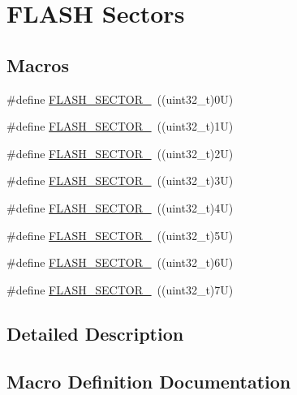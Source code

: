 \hypertarget{group___f_l_a_s_h___sectors}{}\section{F\+L\+A\+SH Sectors}
\label{group___f_l_a_s_h___sectors}
\subsection*{Macros}
\begin{DoxyCompactItemize}
\item 
\#define \mbox{\hyperlink{group___f_l_a_s_h___sectors_ga15a8729b9c5eb83d46d5f437cd46d874}{F\+L\+A\+S\+H\+\_\+\+S\+E\+C\+T\+O\+R\+\_}}~((uint32\+\_\+t)0\+U)
\item 
\#define \mbox{\hyperlink{group___f_l_a_s_h___sectors_ga2a85d94366030ea8328796169c1bc300}{F\+L\+A\+S\+H\+\_\+\+S\+E\+C\+T\+O\+R\+\_}}~((uint32\+\_\+t)1\+U)
\item 
\#define \mbox{\hyperlink{group___f_l_a_s_h___sectors_ga58999952d63fd45dd86b0817ad2a5bae}{F\+L\+A\+S\+H\+\_\+\+S\+E\+C\+T\+O\+R\+\_}}~((uint32\+\_\+t)2\+U)
\item 
\#define \mbox{\hyperlink{group___f_l_a_s_h___sectors_gab0a0ce95752a56b430c809a88812fed2}{F\+L\+A\+S\+H\+\_\+\+S\+E\+C\+T\+O\+R\+\_}}~((uint32\+\_\+t)3\+U)
\item 
\#define \mbox{\hyperlink{group___f_l_a_s_h___sectors_gac1338c8f4ab3ae74d212c59c7e9e4cc6}{F\+L\+A\+S\+H\+\_\+\+S\+E\+C\+T\+O\+R\+\_}}~((uint32\+\_\+t)4\+U)
\item 
\#define \mbox{\hyperlink{group___f_l_a_s_h___sectors_gad8736215a8d3ce115f4281a6d026d0f8}{F\+L\+A\+S\+H\+\_\+\+S\+E\+C\+T\+O\+R\+\_}}~((uint32\+\_\+t)5\+U)
\item 
\#define \mbox{\hyperlink{group___f_l_a_s_h___sectors_gaa0d1fc04e5918186ac9c228ab4172606}{F\+L\+A\+S\+H\+\_\+\+S\+E\+C\+T\+O\+R\+\_}}~((uint32\+\_\+t)6\+U)
\item 
\#define \mbox{\hyperlink{group___f_l_a_s_h___sectors_ga99693b9e0816fdb8706218bc845724ad}{F\+L\+A\+S\+H\+\_\+\+S\+E\+C\+T\+O\+R\+\_}}~((uint32\+\_\+t)7\+U)
\end{DoxyCompactItemize}


\subsection{Detailed Description}


\subsection{Macro Definition Documentation}
\mbox{\label{group___f_l_a_s_h___sectors_ga15a8729b9c5eb83d46d5f437cd46d874}} 
